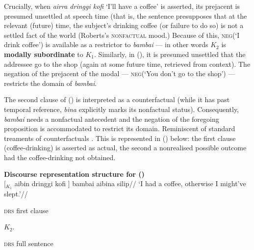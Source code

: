 \xe


\noindent Crucially, when \textit{airra dringgi kofi} `I'll have a coffee' is asserted, its prejacent is presumed unsettled at speech time (that is, the sentence presupposes that at the relevant (future) time, the subject's drinking coffee (or failure to do so) is not a settled fact of the world (Roberts's \textsc{nonfactual} mood.) Because of this, \textsc{neg}(`I drink coffee') is
available as a restrictor to \textit{bambai} --- in other words $ \mathit{K_2} $ is \textbf{modally subordinate} to $ \mathit{K_1} $. Similarly, in (), it is presumed unsettled that the addressee go to the shop (again at some future time, retrieved from context). The negation of the prejacent of the modal --- \textsc{neg}(`You don't go to the shop') --- restricts the domain of \textit{bambai}.


The second clause of () is interpreted as a counterfactual (while it has past temporal reference, \textit{bina} explicitly marks its nonfactual status). Consequently, \textit{bambai} needs a nonfactual antecedent and the negation of the foregoing proposition is accommodated to restrict its domain. Reminiscent of standard treaments of counterfactuals \citetext{\textit{i.e.}, where worlds in a nonrealistic proposition are ranked by their ``similarity'' to the actual world, see \citealp{Lewis1973,Kratzer1981,VonFintel2001,VonFintel2012}}. This is represented in () below: the first clause (coffee-drinking) is asserted as actual, the second a nonrealised possible outcome had the coffee-drinking not obtained.


\pex[labeltype=numeric,labelformat=$\mathit K_A.$] \textbf{Discourse representation structure for ()}\\
\begingl\gla{} \textup{[$ _{\mathit{K_1}} $} aibin dringgi kofi \textup{]} bambai aibina silip//
\glft`I had a coffee, otherwise I might've slept.'//\endgl{}\\
\a \begin{minipage}[t]{.25\textwidth}\textsc{drs} first clause\\
	
	
\end{minipage}$ \mathit{K_2} $.\quad\begin{minipage}[t]{.3\textwidth}\textsc{drs} full sentence\\
	
\end{minipage}


